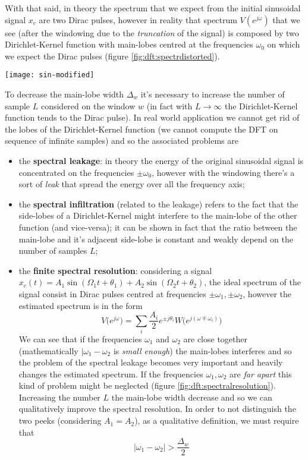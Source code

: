 	With that said, in theory the spectrum that we expect from the initial sinusoidal signal $x_c$ are two Dirac pulses, however in reality that spectrum $V(e^{j\omega})$ that we see (after the windowing due to the \textit{truncation} of the signal) is composed by two Dirichlet-Kernel function with main-lobes centred at the frequencies $\omega_0$ on which we expect the Dirac pulses (figure \ref{fig:dft:spectrdistorted}).
	
	\begin{SCfigure}[2][bht]
		\centering \texttt{[image: sin-modified]}
		\caption{spectrum of the signal  $v(n)= x(n)w(n)$ that's distorted due to the windowing.}
		\label{fig:dft:spectrdistorted}
	\end{SCfigure}
	
	To decrease the main-lobe width $\Delta_w$ it's necessary to increase the number of sample $L$ considered on the window $w$ (in fact with $L\rightarrow \infty$ the Dirichlet-Kernel function tends to the Dirac pulse). In real world application we cannot get rid of the lobes of the Dirichlet-Kernel function (we cannot compute the DFT on sequence of infinite samples) and so the associated problems are 
	\begin{itemize}
		\item the \textbf{spectral leakage}: in theory the energy of the original sinusoidal signal is concentrated on the frequencies $\pm \omega_0$, however with the windowing  there's a sort of \textit{leak} that spread the energy over all the frequency axis;
		
		\item the \textbf{spectral infiltration} (related to the leakage) refers to the fact that the side-lobes of a Dirichlet-Kernel might interfere to the main-lobe of the other function (and vice-versa); it can be shown in fact that the ratio between the main-lobe and it's adjacent side-lobe is constant and weakly depend on the number of samples $L$;
		
		\item the \textbf{finite spectral resolution}: considering a signal $x_c(t) = A_1 \sin(\Omega_1t + \theta_1) + A_2 \sin(\Omega_2t + \theta_2)$, the ideal spectrum of the signal consist in Dirac pulses centred at frequencies $\pm \omega_1,\pm \omega_2$, however the estimated spectrum is in the form
		\[ V\big(e^{j\omega}\big) = \sum_i \frac{A_i}2 e^{\pm j\theta_i} W\Big( e^{j(\omega \mp \omega_i)} \Big) \]
		We can see that if the frequencies $\omega_1$ and $\omega_2$ are close together (mathematically $|\omega_1-\omega_2$ is \textit{small enough}) the main-lobes interferes and so the problem of the spectral leakage becomes very important and heavily changes the estimated spectrum. If the frequencies $\omega_1,\omega_2$ are \textit{far apart} this kind of problem might be neglected (figure \ref{fig:dft:spectralresolution}). Increasing the number $L$ the main-lobe width decrease and so we can qualitatively improve the spectral resolution. In order to not distinguish the two peeks (considering $A_1 = A_2$), as a qualitative definition, we must require that
		\[ |\omega_1-\omega_2| > \frac{\Delta_w}{2} \]
				
	\end{itemize}

